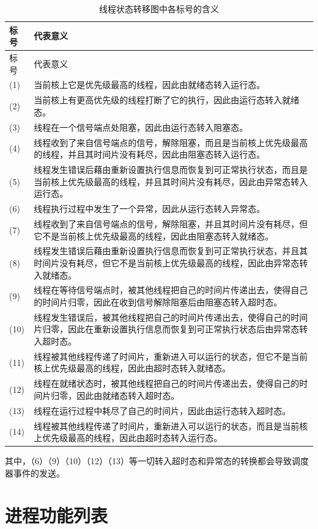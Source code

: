 \begin{xltabular}{\textwidth}{@{}>{\hsize\raggedright\arraybackslash}X>{\hsize\raggedright\arraybackslash}X@{}}
\caption{线程状态转移图中各标号的含义}\label{tab:4-7-thread-state-transition-labels}\\
\toprule
标号 & 代表意义\tabularnewline
\endfirsthead
\toprule
标号 & 代表意义\tabularnewline
\midrule
\endhead
\bottomrule
\endlastfoot
    (1) & 当前核上它是优先级最高的线程，因此由就绪态转入运行态。\tabularnewline
    (2) & 当前核上有更高优先级的线程打断了它的执行，因此由运行态转入就绪态。\tabularnewline
    (3) & 线程在一个信号端点处阻塞，因此由运行态转入阻塞态。\tabularnewline
    (4) & 线程收到了来自信号端点的信号，解除阻塞，而且是当前核上优先级最高的线程，并且其时间片没有耗尽，因此由阻塞态转入运行态。\tabularnewline
    (5) & 线程发生错误后藉由重新设置执行信息而恢复到可正常执行状态，而且是当前核上优先级最高的线程，并且其时间片没有耗尽，因此由异常态转入运行态。\tabularnewline
    (6) & 线程执行过程中发生了一个异常，因此从运行态转入异常态。\tabularnewline
    (7) & 线程收到了来自信号端点的信号，解除阻塞，并且其时间片没有耗尽，但它不是当前核上优先级最高的线程，因此由阻塞态转入就绪态。\tabularnewline
    (8) & 线程发生错误后藉由重新设置执行信息而恢复到可正常执行状态，并且其时间片没有耗尽，但它不是当前核上优先级最高的线程，因此由异常态转入就绪态。\tabularnewline
    (9) & 线程在等待信号端点时，被其他线程把自己的时间片传递出去，使得自己的时间片归零，因此在收到信号解除阻塞后由阻塞态转入超时态。\tabularnewline
    (10) & 线程发生错误后，被其他线程把自己的时间片传递出去，使得自己的时间片归零，因此在重新设置执行信息而恢复到可正常执行状态后由异常态转入超时态。\tabularnewline
    (11) & 线程被其他线程传递了时间片，重新进入可以运行的状态，但它不是当前核上优先级最高的线程，因此由超时态转入就绪态。\tabularnewline
    (12) & 线程在就绪状态时，被其他线程把自己的时间片传递出去，使得自己的时间片归零，因此由就绪态转入超时态。\tabularnewline
    (13) & 线程在运行过程中耗尽了自己的时间片，因此由运行态转入超时态。\tabularnewline
    (14) & 线程被其他线程传递了时间片，重新进入可以运行的状态，而且是当前核上优先级最高的线程，因此由超时态转入运行态。\tabularnewline
\end{xltabular}

其中，（6）（9）（10）（12）（13）等一切转入超时态和异常态的转换都会导致调度器事件的发送。

\section{进程功能列表}\label{sec:4-process-function-list}

